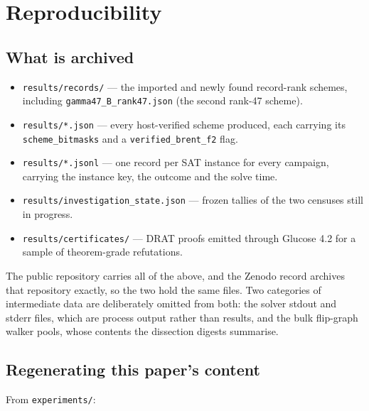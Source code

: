 \documentclass[11pt]{article}
\begin{document}
\section{Reproducibility}

\subsection{What is archived}

\begin{itemize}
\item \texttt{results/records/} --- the imported and newly found record-rank schemes, including
\texttt{gamma47\_B\_rank47.json} (the second rank-47 scheme).
\item \texttt{results/*.json} --- every host-verified scheme produced, each carrying its
\texttt{scheme\_bitmasks} and a \texttt{verified\_brent\_f2} flag.
\item \texttt{results/*.jsonl} --- one record per SAT instance for every campaign, carrying the
instance key, the outcome and the solve time.
\item \texttt{results/investigation\_state.json} --- frozen tallies of the two censuses still in progress.
\item \texttt{results/certificates/} --- DRAT proofs emitted through Glucose 4.2 for a sample of
theorem-grade refutations.
\end{itemize}

\noindent The public repository carries all of the above, and the Zenodo record archives that repository
exactly, so the two hold the same files. Two categories of intermediate data are deliberately omitted
from both: the solver stdout and stderr files, which are process output rather than results, and the bulk
flip-graph walker pools, whose contents the dissection digests summarise.

\subsection{Regenerating this paper's content}

From \texttt{experiments/}:
\end{document}
